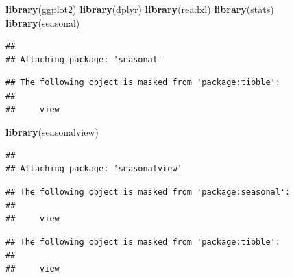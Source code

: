 \documentclass[
]{book}
\newenvironment{Shaded}{\begin{snugshade}}{\end{snugshade}}
\newcommand{\AttributeTok}[1]{\textcolor[rgb]{0.13,0.29,0.53}{#1}}
\newcommand{\CommentTok}[1]{\textcolor[rgb]{0.56,0.35,0.01}{\textit{#1}}}
\newcommand{\ConstantTok}[1]{\textcolor[rgb]{0.56,0.35,0.01}{#1}}
\newcommand{\DecValTok}[1]{\textcolor[rgb]{0.00,0.00,0.81}{#1}}
\newcommand{\FunctionTok}[1]{\textcolor[rgb]{0.13,0.29,0.53}{\textbf{#1}}}
\newcommand{\NormalTok}[1]{#1}
\newcommand{\OtherTok}[1]{\textcolor[rgb]{0.56,0.35,0.01}{#1}}
\newcommand{\SpecialCharTok}[1]{\textcolor[rgb]{0.81,0.36,0.00}{\textbf{#1}}}
\newcommand{\StringTok}[1]{\textcolor[rgb]{0.31,0.60,0.02}{#1}}
\begin{document}
\begin{Shaded}
\begin{Highlighting}[]
\FunctionTok{library}\NormalTok{(ggplot2)}
\FunctionTok{library}\NormalTok{(dplyr)}
\FunctionTok{library}\NormalTok{(readxl)}
\FunctionTok{library}\NormalTok{(stats)}
\FunctionTok{library}\NormalTok{(seasonal)}
\end{Highlighting}
\end{Shaded}

\begin{verbatim}
## 
## Attaching package: 'seasonal'
\end{verbatim}

\begin{verbatim}
## The following object is masked from 'package:tibble':
## 
##     view
\end{verbatim}

\begin{Shaded}
\begin{Highlighting}[]
\FunctionTok{library}\NormalTok{(seasonalview)}
\end{Highlighting}
\end{Shaded}

\begin{verbatim}
## 
## Attaching package: 'seasonalview'
\end{verbatim}

\begin{verbatim}
## The following object is masked from 'package:seasonal':
## 
##     view
\end{verbatim}

\begin{verbatim}
## The following object is masked from 'package:tibble':
## 
##     view
\end{verbatim}

\begin{Shaded}
\end{Shaded}
\end{document}
